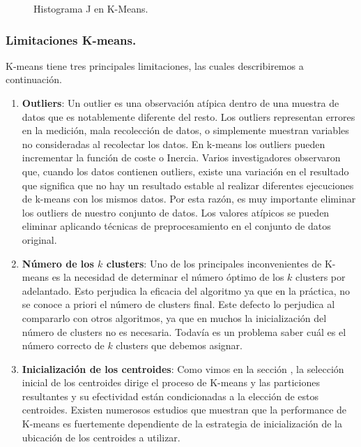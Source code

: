 \documentclass[12pt,a4paper]{article}
\begin{document}
\begin{sloppypar}
\begin{figure}[H]
\begin{minipage}[b]{0.5\linewidth}
\caption{Histograma J en K-Means. \cite{apunte_uba}}
\label{fig:K_means_costo_4}
\end{minipage}
\end{figure}

\cleardoublepage
\subsubsection{Limitaciones K-means.}

K-means tiene tres principales limitaciones, las cuales describiremos a continuación.

\begin{enumerate}

\item \textbf{Outliers}: Un outlier es una observación atípica dentro de una muestra de datos que es notablemente diferente del resto. Los outliers representan errores en la medición, mala recolección de datos, o simplemente muestran variables no consideradas al recolectar los datos.
En k-means los outliers pueden incrementar la función de coste o Inercia. Varios investigadores observaron que, cuando los datos contienen outliers, existe una variación en el resultado que significa que no hay un resultado estable al realizar diferentes ejecuciones de k-means con los mismos datos\cite{K_means_review}. Por esta razón, es muy importante eliminar los outliers de nuestro conjunto de datos. Los valores atípicos se pueden eliminar aplicando técnicas de preprocesamiento en el conjunto de datos original.

\item \textbf{Número de los $k$ clusters}: Uno de los principales inconvenientes de K-means es la necesidad de determinar el número óptimo de los $k$ clusters por adelantado. Esto perjudica la eficacia del algoritmo ya que en la práctica, no se conoce a priori el número de clusters final. Este defecto lo perjudica al compararlo con otros algoritmos, ya que en muchos la inicialización del número de clusters no es necesaria. Todavía es un problema saber cuál es el número correcto de $k$ clusters que debemos asignar\cite{K_means_review}.

\item \textbf{Inicialización de los centroides}: Como vimos en la sección \textit{}, la selección inicial de los centroides dirige el proceso de K-means y las particiones resultantes y su efectividad están condicionadas a la elección de estos centroides\cite{K_means_experiment}. 
Existen numerosos estudios\cite{K_means_initial_centroids} que muestran que la performance de K-means es fuertemente dependiente de la estrategia de inicialización de la ubicación de los centroides a utilizar.


\end{enumerate}
\end{sloppypar}
\end{document}
